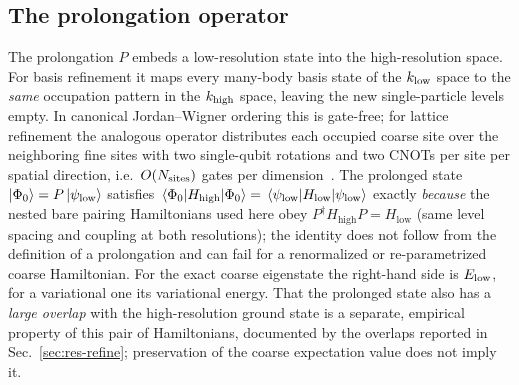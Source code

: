 \documentclass[
  aps,            %
  prc,            %
  reprint,        %
  superscriptaddress,
  floatfix,
  nofootinbib
]{revtex4-2}
\newcommand{\Hlow}{H_{\mathrm{low}}}
\newcommand{\Hhigh}{H_{\mathrm{high}}}
\begin{document}
\subsection{The prolongation operator}
The prolongation $P$ embeds a low-resolution state into the high-resolution space.
For basis refinement it maps every many-body basis state of the $k_{\rm low}$ space to
the \emph{same} occupation pattern in the $k_{\rm high}$ space, leaving the new
single-particle levels empty.  In canonical Jordan--Wigner ordering this is
gate-free; for lattice refinement the analogous operator distributes each occupied
coarse site over the neighboring fine sites with two single-qubit rotations and two
CNOTs per site per spatial direction, i.e.\ $O(N_{\rm sites})$ gates per
dimension~\cite{Bogner2026}.  The prolonged state $\ket{\Phi_0}=P\ket{\psi_{\rm low}}$
satisfies $\expval{\Hhigh}{\Phi_0}=\expval{\Hlow}{\psi_{\rm low}}$ exactly
\emph{because} the nested bare pairing Hamiltonians used here obey
$P^\dagger\Hhigh P=\Hlow$ (same level spacing and coupling at both
resolutions); the identity does not follow from the definition of a
prolongation and can fail for a renormalized or re-parametrized coarse
Hamiltonian.  For the exact coarse eigenstate the right-hand side is
$E_{\rm low}$, for a variational one its variational energy.  That the
prolonged state also has a \emph{large overlap} with the high-resolution
ground state is a separate, empirical property of this pair of Hamiltonians,
documented by the overlaps reported in Sec.~\ref{sec:res-refine}; preservation
of the coarse expectation value does not imply it.
\end{document}
